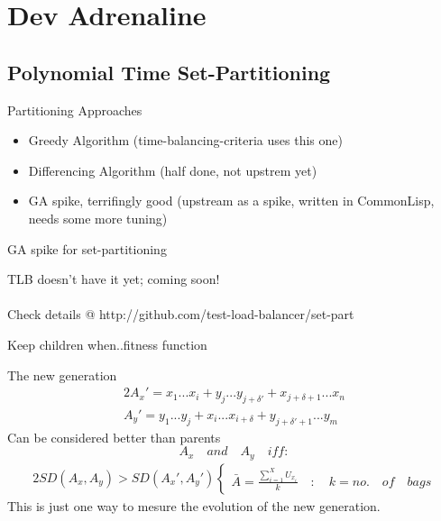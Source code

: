 \documentclass{beamer}
\begin{document}
\section{Dev Adrenaline}

\subsection{Polynomial Time Set-Partitioning}

\begin{frame}{Partitioning Approaches}
  \begin{itemize}
    \item Greedy Algorithm (time-balancing-criteria uses this one)
    \item Differencing Algorithm (half done, not upstrem yet)
    \item GA spike, terrifingly good (upstream as a spike, written in CommonLisp, needs some more tuning)
  \end{itemize}
\end{frame}

\begin{frame}{GA spike for set-partitioning}
  \begin{center}
    {\large TLB doesn't have it yet; coming soon! }\\
    \quad\\
    {\small Check details @ http://github.com/test-load-balancer/set-part }
  \end{center}
\end{frame}

\begin{frame}{Keep children when..}{fitness function}
  \begin{center}
    The new generation
    \begin{alignat}{2}
      A_x' =x_1...x_{i} + y_j...y_{j + \delta'} + x_{j+\delta+1}...x_n\\
      A_y' =y_1...y_{j} + x_i...x_{i + \delta} + y_{j+\delta'+1}...y_m
    \end{alignat}
    Can be considered better than parents $$A_x\quad and\quad A_y\quad iff:$$
    \begin{alignat}{2}
      SD(A_x,A_y) > SD(A_x', A_y') 
      \begin{cases}
        \bar{A} = \frac{\sum_{i=1}^XU_{x_i}}{k}\quad :\quad k = no.\quad of\quad bags
      \end{cases}
    \end{alignat}
    This is just one way to mesure the evolution of the new generation.\\
  \end{center}
\end{frame}
\end{document}
